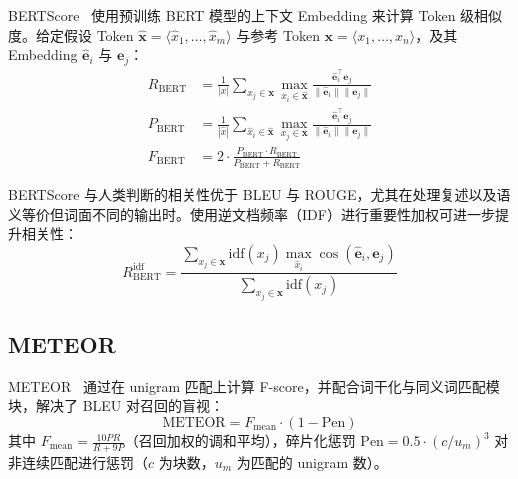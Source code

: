 BERTScore~\cite{zhang2020bertscore} 使用预训练 BERT 模型的上下文 Embedding 来计算 Token 级相似度。给定假设 Token $\hat{\mathbf{x}} = \langle \hat{x}_1, \ldots, \hat{x}_m \rangle$ 与参考 Token $\mathbf{x} = \langle x_1, \ldots, x_n \rangle$，及其 Embedding $\hat{\mathbf{e}}_i$ 与 $\mathbf{e}_j$：
\begin{align}
    R_{\text{BERT}} &= \frac{1}{|x|} \sum_{x_j \in \mathbf{x}} \max_{\hat{x}_i \in \hat{\mathbf{x}}} \frac{\hat{\mathbf{e}}_i^\top \mathbf{e}_j}{\|\hat{\mathbf{e}}_i\| \|\mathbf{e}_j\|} \\[4pt]
    P_{\text{BERT}} &= \frac{1}{|\hat{x}|} \sum_{\hat{x}_i \in \hat{\mathbf{x}}} \max_{x_j \in \mathbf{x}} \frac{\hat{\mathbf{e}}_i^\top \mathbf{e}_j}{\|\hat{\mathbf{e}}_i\| \|\mathbf{e}_j\|} \\[4pt]
    F_{\text{BERT}} &= 2 \cdot \frac{P_{\text{BERT}} \cdot R_{\text{BERT}}}{P_{\text{BERT}} + R_{\text{BERT}}}
\end{align}

BERTScore 与人类判断的相关性优于 BLEU 与 ROUGE，尤其在处理复述以及语义等价但词面不同的输出时。使用逆文档频率（IDF）进行重要性加权可进一步提升相关性：
\begin{equation}
    R_{\text{BERT}}^{\text{idf}} = \frac{\sum_{x_j \in \mathbf{x}} \text{idf}(x_j) \max_{\hat{x}_i} \cos(\hat{\mathbf{e}}_i, \mathbf{e}_j)}{\sum_{x_j \in \mathbf{x}} \text{idf}(x_j)}
\end{equation}

\subsection{METEOR}
\label{meteor}

METEOR~\cite{banerjee2005meteor} 通过在 unigram 匹配上计算 F-score，并配合词干化与同义词匹配模块，解决了 BLEU 对召回的盲视：
\begin{equation}
    \text{METEOR} = F_{\text{mean}} \cdot (1 - \text{Pen})
\end{equation}
其中 $F_{\text{mean}} = \frac{10PR}{R + 9P}$（召回加权的调和平均），碎片化惩罚 $\text{Pen} = 0.5 \cdot (c/u_m)^3$ 对非连续匹配进行惩罚（$c$ 为块数，$u_m$ 为匹配的 unigram 数）。

